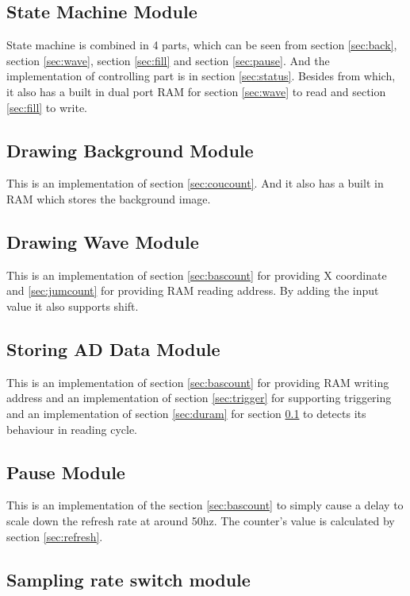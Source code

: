\documentclass[11pt]{scrartcl}
\begin{document}
\subsection{State Machine Module}
\label{sec:statusm}
State machine is combined in 4 parts, which can be seen from section \ref{sec:back}, section \ref{sec:wave}, section \ref{sec:fill} and section \ref{sec:pause}. And the implementation of controlling part is in section \ref{sec:status}. Besides from which, it also has a built in dual port RAM for section \ref{sec:wave} to read and section \ref{sec:fill} to write.
\subsection{Drawing Background Module}
This is an implementation of section \ref{sec:coucount}. And it also has a built in RAM which stores the background image.
\label{sec:back}

\subsection{Drawing Wave Module}
This is an implementation of section \ref{sec:bascount} for providing X coordinate and \ref{sec:jumcount} for providing RAM reading address. By adding the input value it also supports shift.
\label{sec:wave}

\subsection{Storing AD Data Module}
This is an implementation of section \ref{sec:bascount} for providing RAM writing address and an implementation of section \ref{sec:trigger} for supporting triggering and an implementation of section \ref{sec:duram} for section \ref{sec:statusm} to detects its behaviour in reading cycle.
\label{sec:fill}

\subsection{Pause Module}
This is an implementation of the section \ref{sec:bascount} to simply cause a delay to scale down the refresh rate at around 50hz. The counter's value is calculated by section \ref{sec:refresh}.
\label{sec:pause}

\subsection{Sampling rate switch module}
\end{document}
